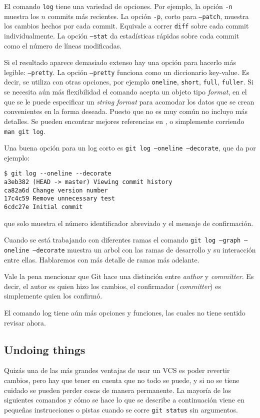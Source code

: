 \documentclass[spanish, 12pt, a4paper]{article}
\begin{document}
El comando \texttt{log} tiene una variedad de opciones.
Por ejemplo, la opción \texttt{-n} muestra los $n$ commits más recientes.
La opción \texttt{-p}, corto para \texttt{--patch}, muestra los cambios hechos
por cada commit.
Equivale a correr \texttt{diff} sobre cada commit individualmente.
La opción \texttt{--stat} da estadísticas rápidas sobre cada commit como el
número de líneas modificadas.

Si el resultado aparece demasiado extenso hay una opción para hacerlo más
legible: \texttt{--pretty}.
La opción \texttt{--pretty} funciona como un diccionario key-value.
Es decir, se utiliza con otras opciones, por ejemplo \texttt{oneline},
\texttt{short}, \texttt{full}, \texttt{fuller}.
Si se necesita aún más flexibilidad el comando acepta un objeto tipo
\textit{format}, en el que se le puede especificar un \textit{string format}
para acomodar los datos que se crean convenientes en la forma deseada.
Puesto que no es muy común no incluyo más detalles. Se pueden encontrar mejores
referencias en \cite[pág.~88]{chacon-2009}, o simplemente corriendo \texttt{man
git log}.

Una buena opción para un log corto es \texttt{git log --oneline --decorate}, que
da por ejemplo:
\begin{lstlisting}
$ git log --oneline --decorate
a3eb382 (HEAD -> master) Viewing commit history
ca82a6d Change version number
17c4c59 Remove unnecessary test
6cdc27e Initial commit
\end{lstlisting}
que solo muestra el número identificador abreviado y el mensaje de confirmación.

Cuando se está trabajando con diferentes ramas el comando \texttt{git log
--graph --oneline --decorate} muestra un arbol con las ramas de desarrollo y su
interacción entre ellas.
Hablaremos con más detalle de ramas más adelante.

Vale la pena mencionar que Git hace una distinción entre \textit{author} y
\textit{committer}.
Es decir, el autor es quien hizo los cambios, el confirmador
(\textit{committer}) es simplemente quien los confirmó.

El comando log tiene aún más opciones y funciones, las cuales no tiene sentido
revisar ahora.

\subsection{Undoing things}
Quizás una de las más grandes ventajas de usar un VCS es poder revertir cambios,
pero hay que tener en cuenta que no todo se puede, y si no se tiene cuidado se
pueden perder cosas de manera permanente.
La mayoría de los siguientes comandos y cómo se hace lo que se describe a
continuación viene en pequeñas instrucciones o pistas cuando se corre
\texttt{git status} sin argumentos.
\end{document}
